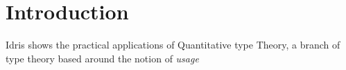 \section{Introduction}

Idris shows the practical applications of Quantitative type Theory, a branch of type theory based around the notion of \emph{usage}\cite{eb_idris_qtt_prac}
